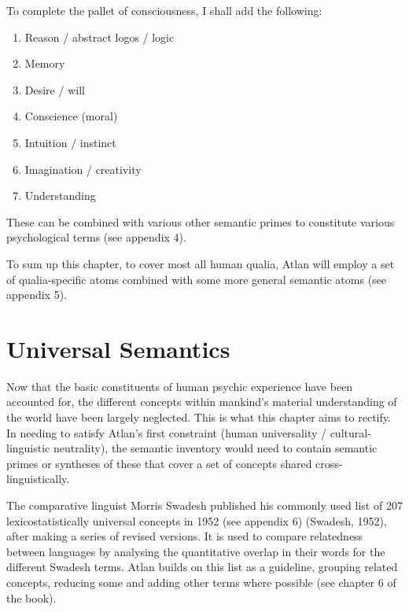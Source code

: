 \noindent To complete the pallet of consciousness, I shall add the following: 
\setcounter{enumi}{9}
\begin{enumerate}
\item   Reason / abstract logos / logic 

\item   Memory 

\item   Desire / will 

\item   Conscience (moral) 

\item   Intuition / instinct 

\item   Imagination / creativity 

\item   Understanding
\end{enumerate}

\noindent These can be combined with various other semantic primes to constitute various psychological terms (see appendix 4).  

To sum up this chapter, to cover most all human qualia, Atlan will employ a set of qualia-specific atoms combined with some more general semantic atoms (see appendix 5).

\section{Universal Semantics}

Now that the basic constituents of human psychic experience have been accounted for, the different concepts within mankind’s material understanding of the world have been largely neglected. This is what this chapter aims to rectify. In needing to satisfy Atlan’s first constraint (human universality / cultural-linguistic neutrality), the semantic inventory would need to contain semantic primes or syntheses of these that cover a set of concepts shared cross-linguistically.  

The comparative linguist Morris Swadesh published his commonly used list of 207 lexicostatistically universal concepts in 1952 (see appendix 6) (Swadesh, 1952), after making a series of revised versions. It is used to compare relatedness between languages by analysing the quantitative overlap in their words for the different Swadesh terms. Atlan builds on this list as a guideline, grouping related concepts, reducing some and adding other terms where possible (see chapter 6 of the book). 

